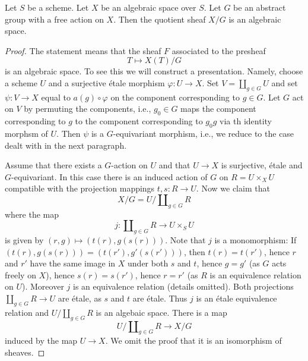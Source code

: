 \begin{lemma}
\label{lemma-quotient}
Let $S$ be a scheme.
Let $X$ be an algebraic space over $S$.
Let $G$ be an abstract group with a free action on $X$.
Then the quotient sheaf $X/G$ is an algebraic space.
\end{lemma}

\begin{proof}
The statement means that the sheaf $F$ associated to the presheaf
$$
T \longmapsto X(T)/G
$$
is an algebraic space. To see this we will construct a presentation.
Namely, choose a scheme $U$ and a surjective \'etale morphism
$\varphi : U \to X$. Set $V = \coprod_{g \in G} U$ and set
$\psi : V \to X$ equal to $a(g) \circ \varphi$ on the component corresponding
to $g \in G$. Let $G$ act on $V$ by permuting the components, i.e.,
$g_0 \in G$ maps the component corresponding to $g$ to the component
corresponding to $g_0g$ via th identity morphsm of $U$.
Then $\psi$ is a $G$-equivariant morphism, i.e., we reduce to the
case dealt with in the next paragraph.

\medskip\noindent
Assume that there exists a $G$-action on $U$ and that $U \to X$ is surjective,
\'etale and $G$-equivariant. In this case there is an induced
action of $G$ on $R = U \times_X U$ compatible with the projection
mappings $t, s : R \to U$. Now we claim that
$$
X/G = U/\coprod\nolimits_{g \in G} R
$$
where the map
$$
j : \coprod\nolimits_{g \in G} R
\longrightarrow
U \times_S U
$$
is given by $(r, g) \mapsto (t(r), g(s(r)))$. Note that $j$ is a monomorphism:
If $(t(r), g(s(r))) = (t(r'), g'(s(r')))$, then
$t(r) = t(r')$, hence $r$ and $r'$ have the same image in $X$ under
both $s$ and $t$, hence $g = g'$ (as $G$ acts freely on $X$), hence
$s(r) = s(r')$, hence $r = r'$ (as $R$ is an equivalence relation on $U$).
Moreover $j$ is an equivalence relation (details omitted).
Both projections $\coprod\nolimits_{g \in G} R \to U$ are \'etale, as
$s$ and $t$ are \'etale. Thus $j$ is an \'etale equivalence relation
and $U/\coprod\nolimits_{g \in G} R$ is an algebaic space.
There is a map
$$
U/\coprod\nolimits_{g \in G} R \longrightarrow X/G
$$
induced by the map $U \to X$. We omit the proof that it is an
isomorphism of sheaves.
\end{proof}












